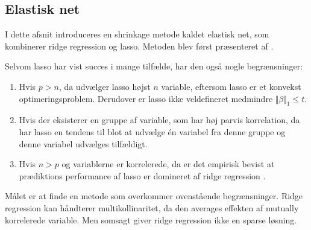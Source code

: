 \subsection{Elastisk net}
I dette afsnit introduceres en shrinkage metode kaldet elastisk net, som kombinerer ridge regression og lasso.
Metoden blev først præsenteret af \citep{zou_hastie}.

Selvom lasso har vist succes i mange tilfælde, har den også nogle begrænsninger:
%
\begin{enumerate}[label=\textnormal{(\arabic*)}]
    \item Hvis $p>n$, da udvælger lasso højst $n$ variable, eftersom lasso er et konvekst optimeringsproblem. Derudover er lasso ikke veldefineret medmindre \(\Vert \beta \Vert_1 \leq t\). \label{itm:1}
    \item Hvis der eksisterer en gruppe af variable, som har høj parvis korrelation, da har lasso en tendens til blot at udvælge  én variabel fra denne gruppe og denne variabel udvælges tilfældigt. \label{itm:2}
    \item Hvis $n>p$ og variablerne er korrelerede, da er det empirisk bevist at prædiktions performance af lasso er domineret af ridge regression \citep{lasso}.  \label{itm:3}
\end{enumerate}
%
Målet er at finde en metode som overkommer ovenstående begrænsninger.
Ridge regression kan håndterer multikollinaritet, da den averages effekten af mutually korrelerede variable.
Men somsagt giver ridge regression ikke en sparse løsning.

